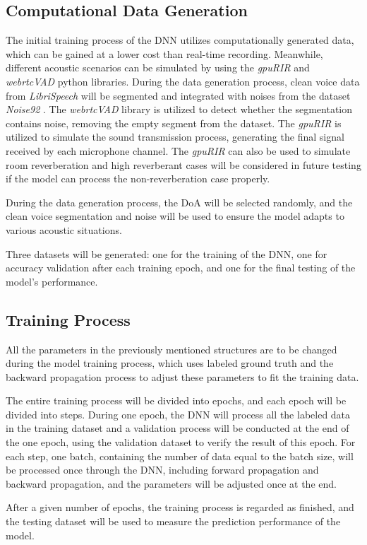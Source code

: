\subsection*{Computational Data Generation}
The initial training process of the DNN utilizes computationally generated data, which can be gained at a lower cost than real-time recording. Meanwhile, different acoustic scenarios can be simulated by using the \textit{gpuRIR} \cite{diaz-guerra_gpurir_2021} and \textit{webrtcVAD} python libraries. During the data generation process, clean voice data from \textit{LibriSpeech} \cite{panayotov_resource_2015} will be segmented and integrated with noises from the dataset \textit{Noise92} \cite{andrew_assessment_1993}. The \textit{webrtcVAD} library is utilized to detect whether the segmentation contains noise, removing the empty segment from the dataset. The \textit{gpuRIR} \cite{diaz-guerra_gpurir_2021} is utilized to simulate the sound transmission process, generating the final signal received by each microphone channel. The \textit{gpuRIR} \cite{diaz-guerra_gpurir_2021} can also be used to simulate room reverberation and high reverberant cases will be considered in future testing if the model can process the non-reverberation case properly.

During the data generation process, the DoA will be selected randomly, and the clean voice segmentation and noise will be used to ensure the model adapts to various acoustic situations.

Three datasets will be generated: one for the training of the DNN, one for accuracy validation after each training epoch, and one for the final testing of the model's performance.

\subsection*{Training Process}
All the parameters in the previously mentioned structures are to be changed during the model training process, which uses labeled ground truth and the backward propagation process to adjust these parameters to fit the training data. 

The entire training process will be divided into epochs, and each epoch will be divided into steps. During one epoch, the DNN will process all the labeled data in the training dataset and a validation process will be conducted at the end of the one epoch, using the validation dataset to verify the result of this epoch. For each step, one batch, containing the number of data equal to the batch size, will be processed once through the DNN, including forward propagation and backward propagation, and the parameters will be adjusted once at the end.

After a given number of epochs, the training process is regarded as finished, and the testing dataset will be used to measure the prediction performance of the model.
